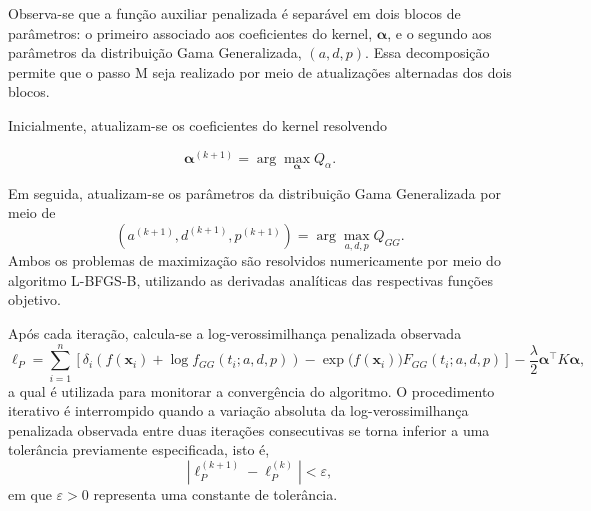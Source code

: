 Observa-se que a função auxiliar penalizada é separável em dois blocos de parâmetros: o primeiro associado aos coeficientes do kernel, \(\boldsymbol{\alpha}\), e o segundo aos parâmetros da distribuição Gama Generalizada, \((a,d,p)\). Essa decomposição permite que o passo M seja realizado por meio de atualizações alternadas dos dois blocos.

Inicialmente, atualizam-se os coeficientes do kernel resolvendo

\begin{equation}
\boldsymbol{\alpha}^{(k+1)}
=
\arg\max_{\boldsymbol{\alpha}}
Q_{\alpha}.
\end{equation}

Em seguida, atualizam-se os parâmetros da distribuição Gama Generalizada por meio de
\begin{equation}
(a^{(k+1)},d^{(k+1)},p^{(k+1)})
=
\arg\max_{a,d,p}
Q_{GG}.
\end{equation}
Ambos os problemas de maximização são resolvidos numericamente por meio do algoritmo L-BFGS-B, utilizando as derivadas analíticas
das respectivas funções objetivo.

Após cada iteração, calcula-se a log-verossimilhança penalizada observada
\begin{equation}
\ell_P
=
\sum_{i=1}^{n}
\left[
\delta_i
\left(
f(\mathbf{x}_i)
+
\log f_{GG}(t_i;a,d,p)
\right)
-
\exp\!\bigl(f(\mathbf{x}_i)\bigr)
F_{GG}(t_i;a,d,p)
\right]
-
\frac{\lambda}{2}
\boldsymbol{\alpha}^{\top}
K
\boldsymbol{\alpha},
\end{equation}
a qual é utilizada para monitorar a convergência do algoritmo. O procedimento iterativo é interrompido quando
a variação absoluta da log-verossimilhança penalizada observada entre duas iterações consecutivas se torna
inferior a uma tolerância previamente especificada, isto é,
\begin{equation}
\left|
\ell_P^{(k+1)}
-
\ell_P^{(k)}
\right|
<
\varepsilon,
\end{equation}
em que \(\varepsilon>0\) representa uma constante de tolerância.



